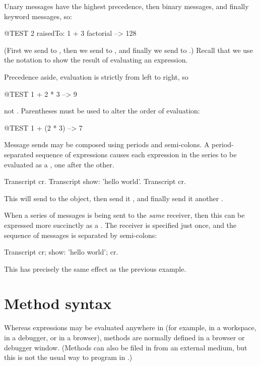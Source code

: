 \documentclass[a4paper,10pt,twoside]{book}
\begin{document}
Unary messages have the highest precedence, then binary messages, and finally keyword messages, so:
\begin{code}{@TEST}
2 raisedTo: 1 + 3 factorial --> 128
\end{code}
(First we send  to , then we send  to , and finally we send  to .)
Recall that we use the notation \ct{-->} to show the result of evaluating an expression.

Precedence aside, evaluation is strictly from left to right, so
\begin{code}{@TEST}
1 + 2 * 3 --> 9
\end{code}
not .
Parentheses must be used to alter the order of evaluation:
\begin{code}{@TEST}
1 + (2 * 3) --> 7
\end{code}

Message sends may be composed using periods and semi-colons.
A period-separated sequence of expressions causes each expression in the series to be evaluated as a , one after the other.

\begin{code}{}
Transcript cr.
Transcript show: 'hello world'.
Transcript cr.
\end{code}

\noindent
This will send  to the  object, then send it , and finally send it another .

When a series of messages is being sent to the \emph{same} receiver, then this can be expressed more succinctly as a .
The receiver is specified just once, and the sequence of messages is separated by semi-colons:

\begin{code}{}
Transcript
	cr;
    show: 'hello world';
    cr.
\end{code}
This has precisely the same effect as the previous example.

\section{Method syntax}

Whereas expressions may be evaluated anywhere in \sq (for example, in a workspace, in a debugger, or in a browser), methods are normally defined in a browser or debugger window.
(Methods can also be filed in from an external medium, but this is not the usual way to program in \sq.)
\end{document}
